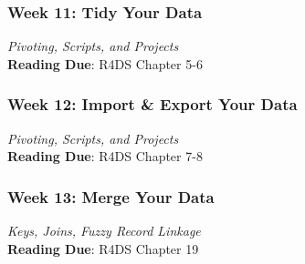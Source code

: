 \documentclass[11pt, letterpaper]{article}
\begin{document}
\subsubsection*{Week 11: Tidy Your Data}
\textit{Pivoting, Scripts, and Projects}\\
\textbf{Reading Due}: R4DS Chapter 5-6

\subsubsection*{Week 12: Import \& Export Your Data}
\textit{Pivoting, Scripts, and Projects}\\
\textbf{Reading Due}: R4DS Chapter 7-8

\subsubsection*{Week 13: Merge Your Data}
\textit{Keys, Joins, Fuzzy Record Linkage}\\
\textbf{Reading Due}: R4DS Chapter 19











\end{document}
